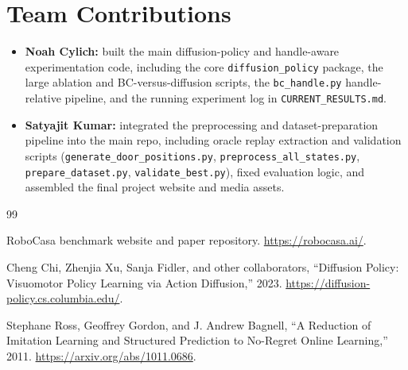 \documentclass[10pt,conference]{IEEEtran}
\begin{document}
\section*{Team Contributions}
\begin{itemize}[leftmargin=1.5em]
    \item \textbf{Noah Cylich:} built the main diffusion-policy and handle-aware experimentation code, including the core \texttt{diffusion\_policy} package, the large ablation and BC-versus-diffusion scripts, the \texttt{bc\_handle.py} handle-relative pipeline, and the running experiment log in \texttt{CURRENT\_RESULTS.md}.
    \item \textbf{Satyajit Kumar:} integrated the preprocessing and dataset-preparation pipeline into the main repo, including oracle replay extraction and validation scripts (\texttt{generate\_door\_positions.py}, \texttt{preprocess\_all\_states.py}, \texttt{prepare\_dataset.py}, \texttt{validate\_best.py}), fixed evaluation logic, and assembled the final project website and media assets.
\end{itemize}


\begin{thebibliography}{99}

RoboCasa benchmark website and paper repository. \url{https://robocasa.ai/}.

Cheng Chi, Zhenjia Xu, Sanja Fidler, and other collaborators, ``Diffusion Policy: Visuomotor Policy Learning via Action Diffusion,'' 2023. \url{https://diffusion-policy.cs.columbia.edu/}.

Stephane Ross, Geoffrey Gordon, and J. Andrew Bagnell, ``A Reduction of Imitation Learning and Structured Prediction to No-Regret Online Learning,'' 2011. \url{https://arxiv.org/abs/1011.0686}.

\end{thebibliography}
\end{document}
